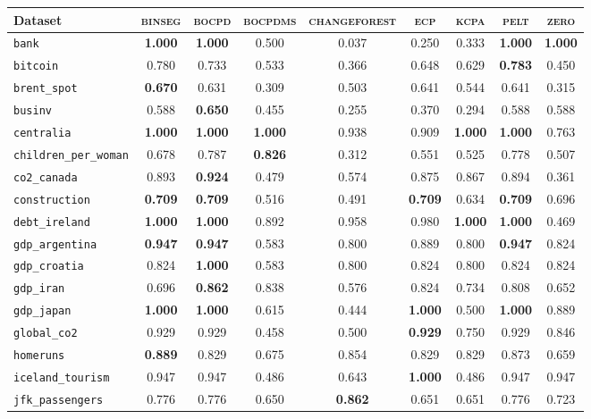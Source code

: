 \begin{tabular}{lcccccccc}
Dataset & \textsc{binseg} & \textsc{bocpd} & \textsc{bocpdms} & \textsc{changeforest} & \textsc{ecp} & \textsc{kcpa} & \textsc{pelt} & \textsc{zero}\\
\toprule
\verb+bank+ & \textbf{1.000} & \textbf{1.000} & 0.500 & 0.037 & 0.250 & 0.333 & \textbf{1.000} & \textbf{1.000}\\
\verb+bitcoin+ & 0.780 & 0.733 & 0.533 & 0.366 & 0.648 & 0.629 & \textbf{0.783} & 0.450\\
\verb+brent_spot+ & \textbf{0.670} & 0.631 & 0.309 & 0.503 & 0.641 & 0.544 & 0.641 & 0.315\\
\verb+businv+ & 0.588 & \textbf{0.650} & 0.455 & 0.255 & 0.370 & 0.294 & 0.588 & 0.588\\
\verb+centralia+ & \textbf{1.000} & \textbf{1.000} & \textbf{1.000} & 0.938 & 0.909 & \textbf{1.000} & \textbf{1.000} & 0.763\\
\verb+children_per_woman+ & 0.678 & 0.787 & \textbf{0.826} & 0.312 & 0.551 & 0.525 & 0.778 & 0.507\\
\verb+co2_canada+ & 0.893 & \textbf{0.924} & 0.479 & 0.574 & 0.875 & 0.867 & 0.894 & 0.361\\
\verb+construction+ & \textbf{0.709} & \textbf{0.709} & 0.516 & 0.491 & \textbf{0.709} & 0.634 & \textbf{0.709} & 0.696\\
\verb+debt_ireland+ & \textbf{1.000} & \textbf{1.000} & 0.892 & 0.958 & 0.980 & \textbf{1.000} & \textbf{1.000} & 0.469\\
\verb+gdp_argentina+ & \textbf{0.947} & \textbf{0.947} & 0.583 & 0.800 & 0.889 & 0.800 & \textbf{0.947} & 0.824\\
\verb+gdp_croatia+ & 0.824 & \textbf{1.000} & 0.583 & 0.800 & 0.824 & 0.800 & 0.824 & 0.824\\
\verb+gdp_iran+ & 0.696 & \textbf{0.862} & 0.838 & 0.576 & 0.824 & 0.734 & 0.808 & 0.652\\
\verb+gdp_japan+ & \textbf{1.000} & \textbf{1.000} & 0.615 & 0.444 & \textbf{1.000} & 0.500 & \textbf{1.000} & 0.889\\
\verb+global_co2+ & 0.929 & 0.929 & 0.458 & 0.500 & \textbf{0.929} & 0.750 & 0.929 & 0.846\\
\verb+homeruns+ & \textbf{0.889} & 0.829 & 0.675 & 0.854 & 0.829 & 0.829 & 0.873 & 0.659\\
\verb+iceland_tourism+ & 0.947 & 0.947 & 0.486 & 0.643 & \textbf{1.000} & 0.486 & 0.947 & 0.947\\
\verb+jfk_passengers+ & 0.776 & 0.776 & 0.650 & \textbf{0.862} & 0.651 & 0.651 & 0.776 & 0.723\\

\end{tabular}
